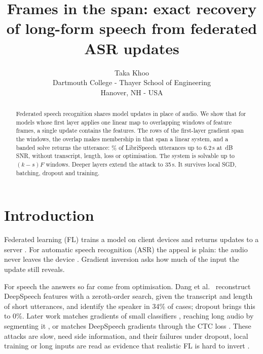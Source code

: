 \documentclass[a4paper]{esannV2}
\begin{document}
\title{Frames in the span: exact recovery of long-form speech from federated ASR updates}

\author{Taka Khoo
\vspace{.3cm}\\
Dartmouth College - Thayer School of Engineering \\
Hanover, NH - USA
}

\maketitle

\begin{abstract}
Federated speech recognition shares model updates in place of audio. We show that for models
whose first layer applies one linear map to overlapping windows of feature frames, a single
update contains the features. The rows of the first-layer gradient span the windows, the
overlap makes membership in that span a linear system, and a banded solve returns the
utterance: \DSshortSucc\% of \DSshortN{} LibriSpeech utterances up to 6.2\,s at
\DSshortSNR\,dB SNR, without transcript, length, loss or optimisation. The system is
solvable up to $(k-s)F$ windows. Deeper layers extend the attack to 35\,s. It survives
local SGD, batching, dropout and training.
\end{abstract}

\section{Introduction}

Federated learning (FL) trains a model on client devices and returns updates to a server
\cite{mcmahan2017communication}. For automatic speech recognition (ASR) the appeal is plain: the audio
never leaves the device \cite{guliani2021training,pelikan2025enabling}. Gradient inversion
\cite{zhu2019dlg,geiping2020inverting} asks how much of the input the update still reveals.

For speech the answers so far come from optimisation. Dang et al.\ \cite{dang2022speaker} reconstruct
DeepSpeech \cite{hannun2014deep} features with a zeroth-order search, given the transcript and length of
short utterances, and identify the speaker in 34\% of cases; dropout brings this to 0\%. Later work
matches gradients of small classifiers \cite{li2023speech,ovi2024gradient}, reaching long audio by
segmenting it \cite{zeng2025recover}, or matches DeepSpeech gradients through the CTC loss
\cite{graves2006connectionist,bui2025reconstructing}. These attacks are slow, need side information, and
their failures under dropout, local training or long inputs are read as evidence that realistic FL is
hard to invert \cite{du2025sok}.
\end{document}
